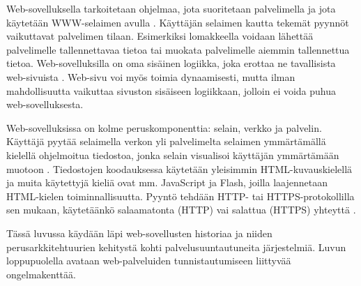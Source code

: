 Web-sovelluksella tarkoitetaan ohjelmaa, jota suoritetaan palvelimella ja jota käytetään WWW-selaimen avulla \cite{uml}. Käyttäjän selaimen kautta tekemät pyynnöt vaikuttavat palvelimen tilaan. Esimerkiksi lomakkeella voidaan lähettää palvelimelle tallennettavaa tietoa tai muokata palvelimelle aiemmin tallennettua tietoa. Web-sovelluksilla on oma sisäinen logiikka, joka erottaa ne tavallisista web-sivuista \cite{uml}. Web-sivu voi myös toimia dynaamisesti, mutta ilman mahdollisuutta vaikuttaa sivuston sisäiseen logiikkaan, jolloin ei voida puhua web-sovelluksesta.

Web-sovelluksissa on kolme peruskomponenttia: selain, verkko ja palvelin. Käyttäjä pyytää selaimella verkon yli palvelimelta selaimen ymmärtämällä kielellä ohjelmoitua tiedostoa, jonka selain visualisoi käyttäjän ymmärtämään muotoon \cite{uml}. Tiedostojen koodauksessa käytetään yleisimmin HTML-kuvauskielellä ja muita käytettyjä kieliä ovat mm. JavaScript ja Flash, joilla laajennetaan HTML-kielen toiminnallisuutta. Pyyntö tehdään HTTP- tai HTTPS-protokollilla sen mukaan, käytetäänkö salaamatonta (HTTP) vai salattua (HTTPS) yhteyttä \cite{rfc2818}.

Tässä luvussa käydään läpi web-sovellusten historiaa ja niiden perusarkkitehtuurien kehitystä kohti palvelusuuntautuneita järjestelmiä. Luvun loppupuolella avataan web-palveluiden tunnistautumiseen liittyvää ongelmakenttää.